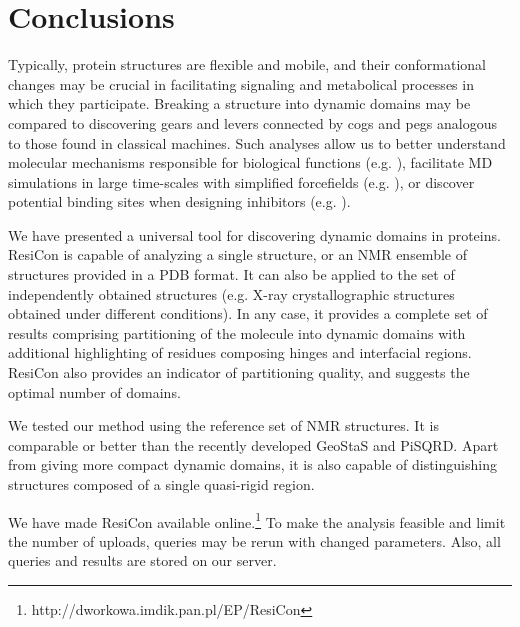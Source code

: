 \documentclass[a4paper,11pt,twoside]{book}%
\begin{document}
\section{Conclusions}
Typically, protein structures are flexible and mobile, and their conformational changes may be crucial in facilitating signaling and metabolical processes in which they participate.
Breaking a structure into dynamic domains may be compared to discovering gears and levers connected by cogs and pegs analogous to those found in classical machines.
Such analyses allow us to better understand molecular mechanisms responsible for biological functions (e.g. \cite{taylor2013classification}), facilitate MD simulations in large time-scales with simplified forcefields (e.g. \cite{sinitskiy2012optimal}), or discover potential binding sites when designing inhibitors (e.g. \cite{zhang2009defining}).

We have presented a universal tool for discovering dynamic domains in proteins.
ResiCon is capable of analyzing a single structure, or an NMR ensemble of structures provided in a PDB format.
It can also be applied to the set of independently obtained structures (e.g. X-ray crystallographic structures obtained under different conditions).
In any case, it provides a complete set of results comprising partitioning of the molecule into dynamic domains with additional highlighting of residues composing hinges and interfacial regions.
ResiCon also provides an indicator of partitioning quality, and suggests the optimal number of domains.

We tested our method using the reference set of NMR structures.
It is comparable or better than the recently developed GeoStaS and PiSQRD.
Apart from giving more compact dynamic domains, it is also capable of distinguishing structures composed of a single quasi-rigid region.

We have made ResiCon available online.\footnote{http://dworkowa.imdik.pan.pl/EP/ResiCon}
To make the analysis feasible and limit the number of uploads, queries may be rerun with changed parameters.
Also, all queries and results are stored on our server.






\newenvironment{packeditemize}
{ \begin{itemize}
    \setlength{\itemsep}{1.5pt}
    \setlength{\parskip}{1.5pt}
    \setlength{\parsep}{1.5pt}     }
{ \end{itemize}                  } 
\end{document}
